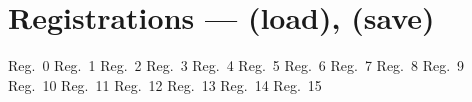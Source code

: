 \section{Registrations ---  (load),  (save)}
Reg.\ 0
Reg.\ 1
Reg.\ 2
Reg.\ 3
Reg.\ 4
Reg.\ 5
Reg.\ 6
Reg.\ 7
Reg.\ 8
Reg.\ 9
Reg.\ 10
Reg.\ 11
Reg.\ 12
Reg.\ 13
Reg.\ 14
Reg.\ 15
